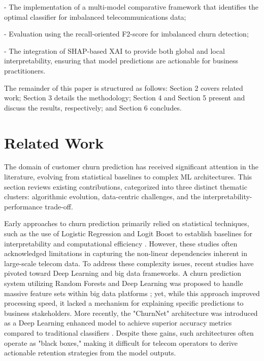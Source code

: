 \documentclass[a4paper,twoside]{article}
\begin{document}
    - The implementation of a multi-model comparative framework that identifies the optimal classifier for imbalanced telecommunications data;

    - Evaluation using the recall-oriented F2-score for imbalanced churn detection;

    - The integration of SHAP-based XAI to provide both global and local interpretability, ensuring that model predictions are actionable for business practitioners.

The remainder of this paper is structured as follows: Section 2 covers related work; Section 3 details the methodology; Section 4 and Section 5 present and discuss the results, respectively; and Section 6 concludes.

\section{Related Work}

The domain of customer churn prediction has received significant attention in the literature, evolving from statistical baselines to complex ML architectures. This section reviews existing contributions, categorized into three distinct thematic clusters: algorithmic evolution, data-centric challenges, and the interpretability-performance trade-off.

Early approaches to churn prediction primarily relied on statistical techniques, such as the use of Logistic Regression and Logit Boost to establish baselines for interpretability and computational efficiency \cite{Jain2020}. However, these studies often acknowledged limitations in capturing the non-linear dependencies inherent in large-scale telecom data. To address these complexity issues, recent studies have pivoted toward Deep Learning and big data frameworks. A churn prediction system utilizing Random Forests and Deep Learning was proposed to handle massive feature sets within big data platforms \cite{Ahmad2019}; yet, while this approach improved processing speed, it lacked a mechanism for explaining specific predictions to business stakeholders. More recently, the "ChurnNet" architecture was introduced as a Deep Learning enhanced model to achieve superior accuracy metrics compared to traditional classifiers \cite{Saha2024}. Despite these gains, such architectures often operate as "black boxes," making it difficult for telecom operators to derive actionable retention strategies from the model outputs.
\end{document}
